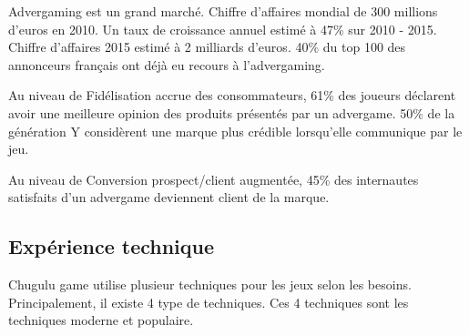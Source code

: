 Advergaming est un grand marché. Chiffre d’affaires mondial de 300 millions d’euros en 2010. Un taux de croissance annuel estimé à 47\% sur 2010 - 2015. Chiffre d’affaires 2015 estimé à 2 milliards d’euros. 40\% du top 100 des annonceurs français ont déjà eu recours à l’advergaming.



Au niveau de Fidélisation accrue des consommateurs, 61\% des joueurs déclarent avoir une meilleure opinion des produits présentés par un advergame. 50\% de la génération Y considèrent une marque plus crédible lorsqu'elle communique par le jeu.

Au niveau de Conversion prospect/client augmentée, 45\% des internautes satisfaits d’un advergame deviennent client de la marque.




\subsection{Expérience technique} %
\label{ssub:expérience_technique}

Chugulu game utilise plusieur techniques pour les jeux selon les besoins. Principalement, il existe 4 type de techniques. Ces 4 techniques sont les techniques moderne et populaire. 

